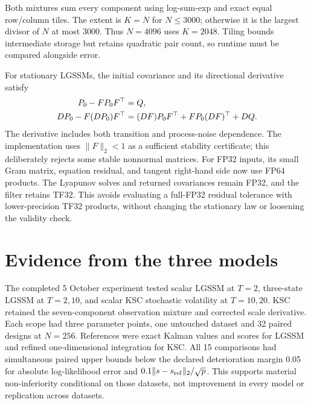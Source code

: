 Both mixtures sum every component using log-sum-exp and exact equal
row/column tiles. The extent is $K=N$ for $N\leq3000$; otherwise it is the
largest divisor of $N$ at most 3000. Thus $N=4096$ uses $K=2048$.
Tiling bounds intermediate storage but retains quadratic pair count, so
runtime must be compared alongside error.

For stationary LGSSMs, the initial covariance and its directional derivative
satisfy
\begin{align}
 P_0-FP_0F^\top&=Q,\notag\\
 DP_0-F(DP_0)F^\top
   &=(DF)P_0F^\top+FP_0(DF)^\top+DQ.
 \label{eq:bf-marginal-stationary-initialization}
\end{align}
The derivative includes both transition and process-noise dependence.
The implementation uses $\lVert F\rVert_2<1$ as a sufficient stability
certificate; this deliberately rejects some stable nonnormal matrices.
For FP32 inputs, its small Gram matrix, equation residual, and tangent
right-hand side now use FP64 products. The Lyapunov solves and returned
covariances remain FP32, and the filter retains TF32. This avoids evaluating a
full-FP32 residual tolerance with lower-precision TF32 products, without
changing the stationary law or loosening the validity check.

\section{Evidence from the three models}
\label{sec:bf-pfpf-marginal-evidence}

The completed 5 October experiment tested scalar LGSSM at $T=2$,
three-state LGSSM at $T=2,10$, and scalar KSC stochastic volatility at
$T=10,20$. KSC retained the seven-component observation mixture and corrected
scale derivative. Each scope had three parameter points, one untouched
dataset and 32 paired designs at $N=256$. References were exact Kalman values
and scores for LGSSM and refined one-dimensional integration for KSC.
All 15 comparisons had simultaneous paired upper bounds below the declared
deterioration margin 0.05 for absolute log-likelihood error and
$0.1\|s-s_{\rm ref}\|_2/\sqrt p$. This supports material non-inferiority
conditional on those datasets, not improvement in every model or replication
across datasets.

